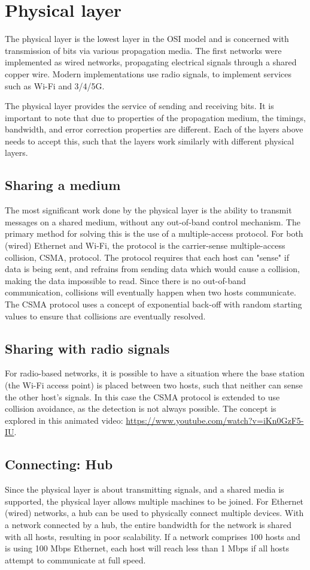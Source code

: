\section{Physical layer}
The physical layer is the lowest layer in the OSI model and is concerned with transmission of bits via various propagation media. The first networks were implemented as wired networks, propagating electrical signals through a shared copper wire. Modern implementations use radio signals, to implement services such as Wi-Fi and 3/4/5G. 

The physical layer provides the service of sending and receiving bits. It is important to note that due to properties of the propagation medium, the timings, bandwidth, and error correction properties are different. Each of the layers above needs to accept this, such that the layers work similarly with different physical layers.

\subsection{Sharing a medium}
The most significant work done by the physical layer is the ability to transmit messages on a shared medium, without any out-of-band control mechanism. The primary method for solving this is the use of a multiple-access protocol. For both (wired) Ethernet and Wi-Fi, the protocol is the carrier-sense multiple-access collision, CSMA, protocol. The protocol requires that each host can "sense" if data is being sent, and refrains from sending data which would cause a collision, making the data impossible to read. Since there is no out-of-band communication, collisions will eventually happen when two hosts communicate. The CSMA protocol uses a concept of exponential back-off with random starting values to ensure that collisions are eventually resolved.

\subsection{Sharing with radio signals}
For radio-based networks, it is possible to have a situation where the base station (the Wi-Fi access point) is placed between two hosts, such that neither can sense the other host's signals. In this case the CSMA protocol is extended to use collision avoidance, as the detection is not always possible. The concept is explored in this animated video: \url{https://www.youtube.com/watch?v=iKn0GzF5-IU}.

\subsection{Connecting: Hub}
Since the physical layer is about transmitting signals, and a shared media is supported, the physical layer allows multiple machines to be joined. For Ethernet (wired) networks, a hub can be used to physically connect multiple devices. With a network connected by a hub, the entire bandwidth for the network is shared with all hosts, resulting in poor scalability. If a network comprises 100 hosts and is using 100 Mbps Ethernet, each host will reach less than 1 Mbps if all hosts attempt to communicate at full speed.

